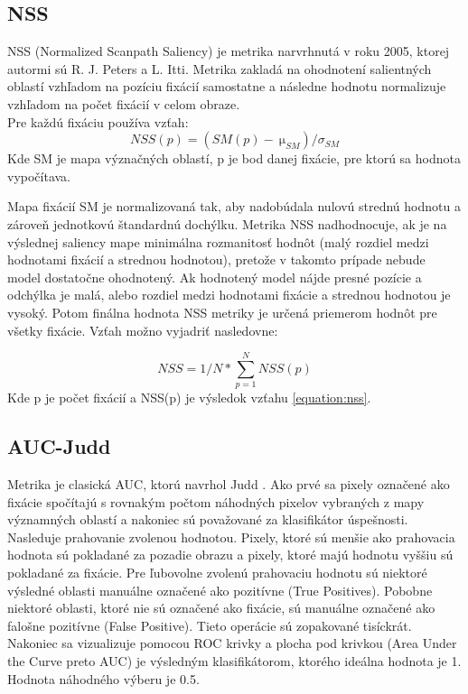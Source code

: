 \subsection{NSS}
NSS (Normalized Scanpath Saliency) je metrika narvrhnutá v roku 2005, ktorej autormi sú R. J. Peters a L. Itti.
Metrika zakladá na ohodnotení salientných oblastí vzhľadom na pozíciu fixácií samostatne a následne hodnotu normalizuje vzhľadom na počet fixácií v celom obraze\cite{metrics-1}.
\\
Pre každú fixáciu používa vzťah:
  \begin{equation}
    NSS(p) =  (SM(p)-\SI{}{\micro}_{SM}) / 	\sigma_{SM}
    \label{equation:nss}
  \end{equation}
Kde SM je mapa význačných oblastí, p je bod danej fixácie, pre ktorú sa hodnota vypočítava.

Mapa fixácií SM je normalizovaná tak, aby nadobúdala nulovú strednú hodnotu a zároveň jednotkovú štandardnú dochýlku.
Metrika NSS nadhodnocuje, ak je na výslednej saliency mape minimálna rozmanitosť hodnôt (malý rozdiel medzi hodnotami fixácií a strednou hodnotou), pretože v takomto prípade nebude model dostatočne ohodnotený.
Ak hodnotený model nájde presné pozície a odchýlka je malá, alebo rozdiel medzi hodnotami fixácie a strednou hodnotou je vysoký.
Potom finálna hodnota NSS metriky je určená priemerom hodnôt pre všetky fixácie\cite{metrics-1}.
Vzťah možno vyjadriť nasledovne:

\begin{equation}
  NSS = 1/N * \sum_{p=1}^{N}NSS(p)  
\end{equation}
Kde p je počet fixácií a NSS(p) je výsledok vzťahu \ref{equation:nss}.

\subsection{AUC-Judd}
Metrika je clasická AUC, ktorú navrhol Judd \cite{auc-judd}.
Ako prvé sa pixely označené ako fixácie spočítajú s rovnakým počtom náhodných pixelov vybraných z mapy významných oblastí a nakoniec sú považované za klasifikátor úspešnosti.
Nasleduje prahovanie zvolenou hodnotou.
Pixely, ktoré sú menšie ako prahovacia hodnota sú pokladané za pozadie obrazu a pixely, ktoré majú hodnotu vyššiu sú pokladané za fixácie.
Pre ľubovolne zvolenú prahovaciu hodnotu sú niektoré výsledné oblasti manuálne označené ako pozitívne (True Positives).
Pobobne niektoré oblasti, ktoré nie sú označené ako fixácie, sú manuálne označené ako falošne pozitívne (False Positive).
Tieto operácie sú zopakované tisíckrát.
Nakoniec sa vizualizuje pomocou ROC krivky a plocha pod krivkou (Area Under the Curve preto AUC) je výsledným klasifikátorom, ktorého ideálna hodnota je 1.
Hodnota náhodného výberu je 0.5.

